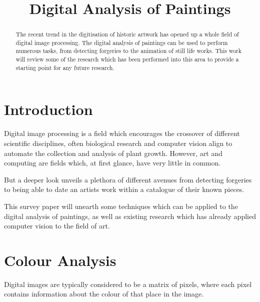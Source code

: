 \documentclass[conference]{IEEEtran}
\begin{document}
\title{Digital Analysis of Paintings}

\author{
}

\maketitle

\begin{abstract}
The recent trend in the digitisation of historic artwork has opened up a whole
field of digital image processing. The digital analysis of paintings can be
used to perform numerous tasks, from detecting forgeries to the animation of
still life works. This work will review some of the research which has been
performed into this area to provide a starting point for any future research.
\end{abstract}

\IEEEpeerreviewmaketitle

\section{Introduction}
Digital image processing is a field which encourages the crossover of different
scientific disciplines, often biological research and computer vision align to
automate the collection and analysis of plant growth. However, art and
computing are fields which, at first glance, have very little in common.

But a deeper look unveils a plethora of different avenues from detecting
forgeries to being able to date an artists work within a catalogue of their
known pieces.

This survey paper will unearth some techniques which can be applied to the
digital analysis of paintings, as well as existing research which has already
applied computer vision to the field of art.

\section{Colour Analysis}
Digital images are typically considered to be a matrix of pixels, where each
pixel contains information about the colour of that place in the image.
\end{document}
